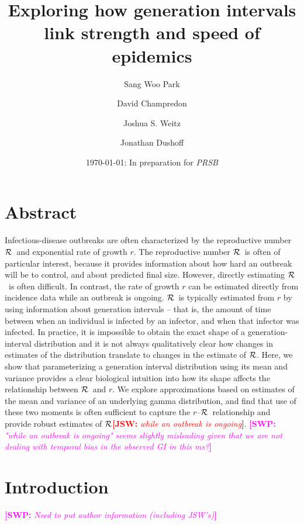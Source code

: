 \documentclass[12pt]{article}
\title{Exploring how generation intervals link strength and speed of epidemics}
\author{Sang Woo Park \and David Champredon \and Joshua S. Weitz \and Jonathan Dushoff}
\date{\today: In preparation for \emph{PRSB}}
\newcommand{\rR}{\mbox{$r$--$\cal R$}}
\newcommand{\RR}{\ensuremath{{\cal R}}}
\newcommand{\comment}[3]{\textcolor{#1}{\textbf{[#2: }\textit{#3}\textbf{]}}}
\newcommand{\swp}[1]{\comment{magenta}{SWP}{#1}}
\newcommand{\jsw}[1]{\comment{red}{JSW}{#1}}
\begin{document}
\maketitle

\section*{Abstract}

Infectious-disease outbreaks are often characterized by the reproductive number \RR\ and exponential rate of growth $r$.
The reproductive number \RR\ is often of particular interest, because it provides information about how hard an outbreak will be to control, and about predicted final size.
However, directly estimating \RR\ is often difficult.
In contrast, the rate of growth $r$ can be estimated directly from incidence data while an outbreak is ongoing.
\RR\ is typically estimated from $r$ by using information about generation intervals -- that is, the amount of time between when an individual is infected by an infector, and when that infector was infected.
In practice, it is impossible to obtain the exact shape of a generation-interval distribution and it is not always qualitatively clear how changes in estimates of the distribution translate to changes in the estimate of \RR.
Here, we show that parameterizing a generation interval distribution using its mean and variance provides a clear biological intuition into how its shape affects the relationship between \RR\ and $r$.
We explore approximations based on estimates of the mean and variance of an underlying gamma distribution, and find that use of these two moments is often sufficient to capture the \rR\ relationship and provide robust estimates of \RR \jsw{while an outbreak is ongoing}.
\swp{"while an outbreak is ongoing" seems slightly misleading given that we are not dealing with temporal bias in the observed GI in this ms?}

\section{Introduction}

\swp{Need to put author information (including JSW's)}
\end{document}
